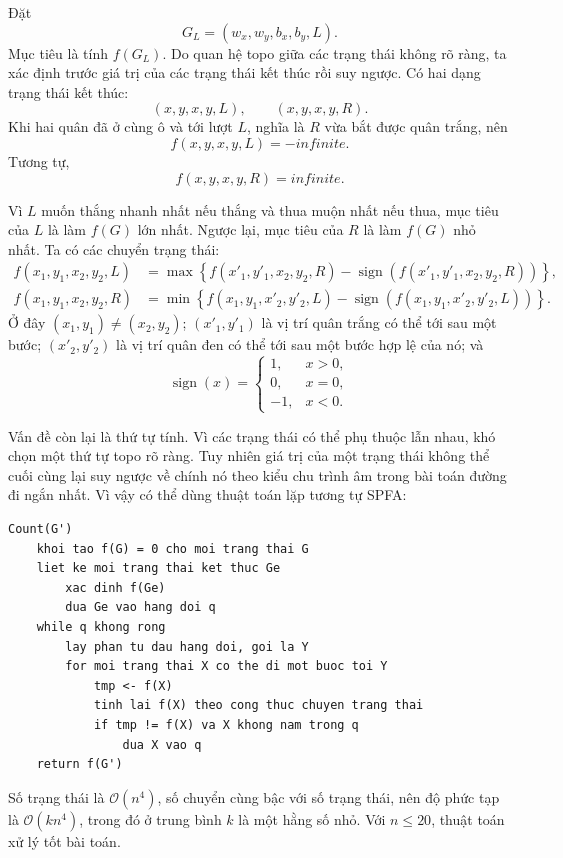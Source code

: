 \documentclass[11pt]{article}
\newcommand{\Oh}{\mathcal{O}}
\newcommand{\Inf}{\mathit{infinite}}
\newcommand{\sgn}{\operatorname{sign}}
\begin{document}
Đặt
\[
  G_L=(w_x,w_y,b_x,b_y,L).
\]
Mục tiêu là tính \(f(G_L)\). Do quan hệ topo giữa các trạng thái không rõ
ràng, ta xác định trước giá trị của các trạng thái kết thúc rồi suy ngược. Có
hai dạng trạng thái kết thúc:
\[
  (x,y,x,y,L),\qquad (x,y,x,y,R).
\]
Khi hai quân đã ở cùng ô và tới lượt \(L\), nghĩa là \(R\) vừa bắt được quân
trắng, nên
\[
  f(x,y,x,y,L)=-\Inf.
\]
Tương tự,
\[
  f(x,y,x,y,R)=\Inf.
\]

Vì \(L\) muốn thắng nhanh nhất nếu thắng và thua muộn nhất nếu thua, mục tiêu
của \(L\) là làm \(f(G)\) lớn nhất. Ngược lại, mục tiêu của \(R\) là làm
\(f(G)\) nhỏ nhất. Ta có các chuyển trạng thái:
\[
\begin{aligned}
f(x_1,y_1,x_2,y_2,L)
&=\max\left\{
  f(x'_1,y'_1,x_2,y_2,R)
  -\sgn\!\left(f(x'_1,y'_1,x_2,y_2,R)\right)
\right\},\\
f(x_1,y_1,x_2,y_2,R)
&=\min\left\{
  f(x_1,y_1,x'_2,y'_2,L)
  -\sgn\!\left(f(x_1,y_1,x'_2,y'_2,L)\right)
\right\}.
\end{aligned}
\]
Ở đây \((x_1,y_1)\ne(x_2,y_2)\); \((x'_1,y'_1)\) là vị trí quân trắng có thể
tới sau một bước; \((x'_2,y'_2)\) là vị trí quân đen có thể tới sau một bước
hợp lệ của nó; và
\[
\sgn(x)=
\begin{cases}
  1, & x>0,\\
  0, & x=0,\\
  -1, & x<0.
\end{cases}
\]

Vấn đề còn lại là thứ tự tính. Vì các trạng thái có thể phụ thuộc lẫn nhau,
khó chọn một thứ tự topo rõ ràng. Tuy nhiên giá trị của một trạng thái không
thể cuối cùng lại suy ngược về chính nó theo kiểu chu trình âm trong bài toán
đường đi ngắn nhất. Vì vậy có thể dùng thuật toán lặp tương tự SPFA:

\begin{verbatim}
Count(G')
    khoi tao f(G) = 0 cho moi trang thai G
    liet ke moi trang thai ket thuc Ge
        xac dinh f(Ge)
        dua Ge vao hang doi q
    while q khong rong
        lay phan tu dau hang doi, goi la Y
        for moi trang thai X co the di mot buoc toi Y
            tmp <- f(X)
            tinh lai f(X) theo cong thuc chuyen trang thai
            if tmp != f(X) va X khong nam trong q
                dua X vao q
    return f(G')
\end{verbatim}

Số trạng thái là \(\Oh(n^4)\), số chuyển cùng bậc với số trạng thái, nên độ
phức tạp là \(\Oh(kn^4)\), trong đó ở trung bình \(k\) là một hằng số nhỏ. Với
\(n\le 20\), thuật toán xử lý tốt bài toán.
\end{document}
